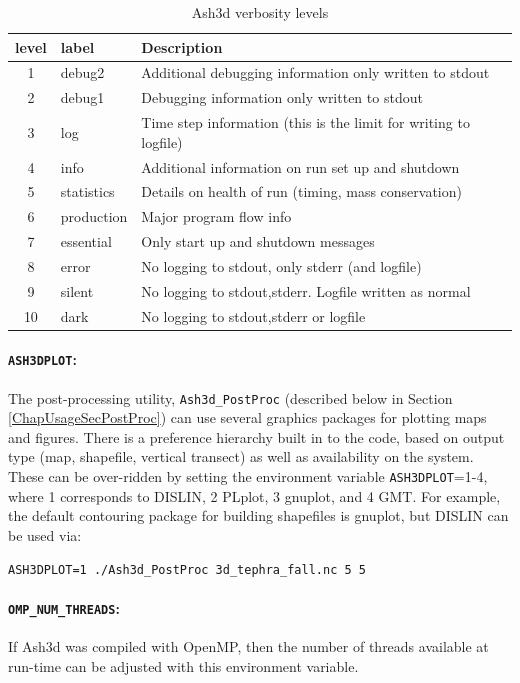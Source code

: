 \small
\begin{table}[htbp]
\begin{center}
\begin{tabular}{| c | l | l |}
\hline
level & label & Description \\
\hline
1& debug2      & Additional debugging information only written to stdout\\
2& debug1      & Debugging information only written to stdout\\
3& log         & Time step information (this is the limit for writing to logfile)\\
4& info        & Additional information on run set up and shutdown\\
5& statistics  & Details on health of run (timing, mass conservation)\\
6& production  & Major program flow info\\
7& essential   & Only start up and shutdown messages\\
8& error       & No logging to stdout, only stderr (and logfile)\\
9& silent      & No logging to stdout,stderr. Logfile written as normal\\
10& dark       & No logging to stdout,stderr or logfile\\
\hline
\end{tabular}
\caption{\label{tab:VerbosityLevels}Ash3d verbosity levels}
\end{center}
\end{table}
\normalsize

\paragraph{\texttt{ASH3DPLOT}:}
The post-processing utility, \texttt{Ash3d\_PostProc} (described below in
Section \ref{ChapUsageSecPostProc}) can use several graphics packages for
plotting maps and figures. There is a preference hierarchy built in to the
code, based on output type (map, shapefile, vertical transect) as well as
availability on the system. These can be over-ridden by setting the
environment variable \texttt{ASH3DPLOT}=1-4, where 1 corresponds to DISLIN,
2 PLplot, 3 gnuplot, and 4 GMT. For example, the default contouring package
for building shapefiles is gnuplot, but DISLIN can be used via:

\texttt{ASH3DPLOT=1 ./Ash3d\_PostProc 3d\_tephra\_fall.nc 5 5}

\paragraph{\texttt{OMP\_NUM\_THREADS}:}
If Ash3d was compiled with OpenMP, then the number of threads available
at run-time can be adjusted with this environment variable.

